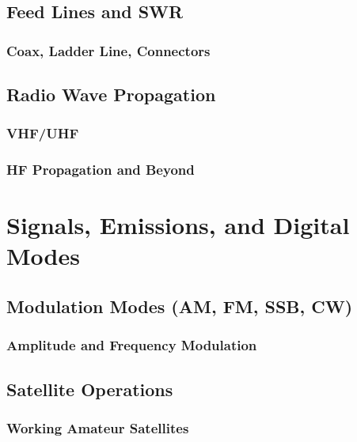 \documentclass[12pt]{book}
\begin{document}
\chapter{Feed Lines and SWR}
\section{Coax, Ladder Line, Connectors}




\chapter{Radio Wave Propagation}
\section{VHF/UHF}

\section{HF Propagation and Beyond}

\part{Signals, Emissions, and Digital Modes}
\chapter{Modulation Modes (AM, FM, SSB, CW)}
\section{Amplitude and Frequency Modulation}




\chapter{Satellite Operations}
\section{Working Amateur Satellites}



\end{document}

